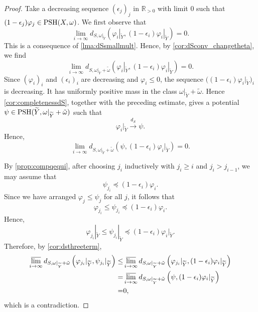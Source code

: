 \begin{proof}
Take a decreasing sequence $(\epsilon_j)_j$ in $\mathbb{R}_{>0}$ with limit $0$ such that $(1-\epsilon_j)\varphi_j\in \mathrm{PSH}(X,\omega)$. We first observe that
    \[
        \lim_{i\to\infty} d_{S,\omega|_{\widetilde{Y}}}\left(\varphi_i|_{\widetilde{Y}},(1-\epsilon_i)\varphi_i|_{\widetilde{Y}}\right)=0.
    \]
This is a consequence of \cref{lma:dSsmallmult}. Hence, by \cref{cor:dSconv_changetheta}, we find
\[
    \lim_{i\to\infty} d_{S,\omega|_{\widetilde{Y}}+\tilde{\omega}}\left(\varphi_i|_{\widetilde{Y}},(1-\epsilon_i)\varphi_i|_{\widetilde{Y}}\right)=0.
\]
Since $(\varphi_i)_i$ and $(\epsilon_i)_i$ are decreasing and $\varphi_i\leq 0$, the sequence $\bigl((1-\epsilon_i)\varphi_i|_{\widetilde{Y}}\bigr)_i$ is decreasing. It has uniformly positive mass in the class $\omega|_{\widetilde{Y}}+\tilde{\omega}$. Hence \cref{cor:completenessdS}, together with the preceding estimate, gives a potential $\psi\in \mathrm{PSH}(\widetilde{Y},\omega|_{\widetilde{Y}}+\tilde{\omega})$ such that
\[
\varphi_i|_{\widetilde{Y}}\xrightarrow{d_S}\psi.
\]
Hence,
\[
\lim_{i\to\infty} d_{S,\omega|_{\widetilde{Y}}+\tilde{\omega}}\left(\psi,(1-\epsilon_i)\varphi_i|_{\widetilde{Y}}\right)=0.
\]

By \cref{prop:compqequi}, after choosing $j_i$ inductively with $j_i\geq i$ and $j_i>j_{i-1}$, we may assume that
\[
    \psi_{j_i}\preceq (1-\epsilon_i)\varphi_i.
\]
Since we have arranged $\varphi_j\leq\psi_j$ for all $j$, it follows that
\[
    \varphi_{j_i}\leq\psi_{j_i}\preceq (1-\epsilon_i)\varphi_i.
\]
Hence,
\[
    \varphi_{j_i}|_{\widetilde{Y}}\leq \psi_{j_i}|_{\widetilde{Y}}\preceq (1-\epsilon_i)\varphi_i|_{\widetilde{Y}}.
\]
Therefore, by \cref{cor:dsthreeterm},
\[
    \begin{aligned}
       \varlimsup_{i\to\infty} d_{S,\omega|_{\widetilde{Y}}+\tilde{\omega}}\left(\varphi_{j_i}|_{\widetilde{Y}},\psi_{j_i}|_{\widetilde{Y}}\right)
     \leq & \varlimsup_{i\to\infty} d_{S,\omega|_{\widetilde{Y}}+\tilde{\omega}}\left(\varphi_{j_i}|_{\widetilde{Y}},(1-\epsilon_i)\varphi_i|_{\widetilde{Y}}\right)\\
     =& \varlimsup_{i\to\infty} d_{S,\omega|_{\widetilde{Y}}+\tilde{\omega}}\left(\psi,(1-\epsilon_i)\varphi_i|_{\widetilde{Y}}\right)\\
     = & 0,
     \end{aligned}
\]
which is a contradiction.
\end{proof}

